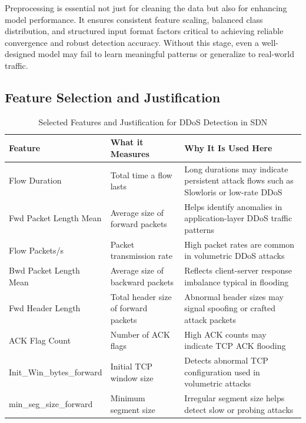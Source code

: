 \documentclass[ASNA,twocolumn]{USG} %
\begin{document}
Preprocessing is essential not just for cleaning the data but also for enhancing model performance. It ensures consistent feature scaling, balanced class distribution, and structured input format factors critical to achieving reliable convergence and robust detection accuracy. Without this stage, even a well-designed model may fail to learn meaningful patterns or generalize to real-world traffic.
\subsection{Feature Selection and Justification}


\begin{table}[hbt!]
\centering
\caption{Selected Features and Justification for DDoS Detection in SDN}
\label{tab:feature_justification}
\begin{tabular}{|p{3cm}|p{4.5cm}|p{8cm}|}
\hline
\textbf{Feature} & \textbf{What it Measures} & \textbf{Why It Is Used Here} \\
\hline
Flow Duration & Total time a flow lasts & Long durations may indicate persistent attack flows such as Slowloris or low-rate DDoS \\
\hline
Fwd Packet Length Mean & Average size of forward packets & Helps identify anomalies in application-layer DDoS traffic patterns \\
\hline
Flow Packets/s & Packet transmission rate & High packet rates are common in volumetric DDoS attacks \\
\hline
Bwd Packet Length Mean & Average size of backward packets & Reflects client-server response imbalance typical in flooding \\
\hline
Fwd Header Length & Total header size of forward packets & Abnormal header sizes may signal spoofing or crafted attack packets \\
\hline
ACK Flag Count & Number of ACK flags & High ACK counts may indicate TCP ACK flooding \\
\hline
Init\_Win\_bytes\_forward & Initial TCP window size & Detects abnormal TCP configuration used in volumetric attacks \\
\hline
min\_seg\_size\_forward & Minimum segment size & Irregular segment size helps detect slow or probing attacks \\
\hline
\end{tabular}
\end{table}
\end{document}
